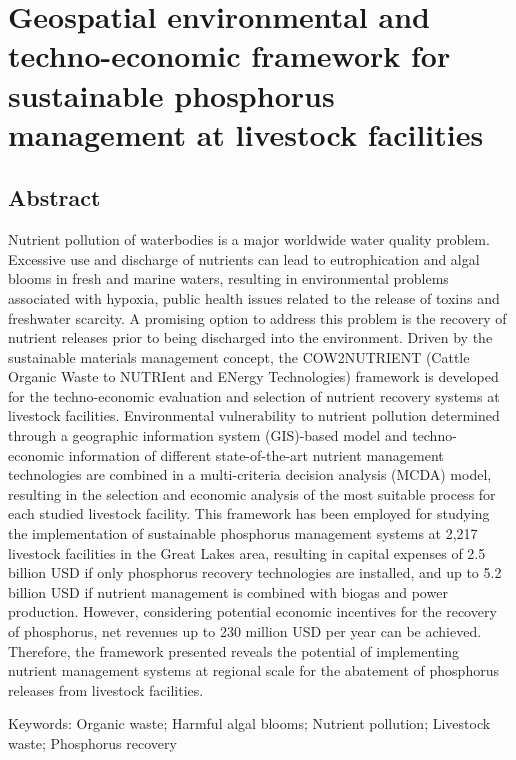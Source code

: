 \chapter{Geospatial environmental and techno-economic framework for	sustainable phosphorus management at livestock facilities}\label{ch:Tool}
\section*{Abstract}
Nutrient pollution of waterbodies is a major worldwide water quality problem. Excessive use and discharge of nutrients can lead to eutrophication and algal blooms in fresh and marine waters, resulting in environmental problems associated with hypoxia, public health issues related to the release of toxins and freshwater scarcity. A promising option to address this problem is the recovery of nutrient releases prior to being discharged into the environment. Driven by the sustainable materials management concept, the COW2NUTRIENT (Cattle Organic Waste to NUTRIent and ENergy Technologies) framework is developed for the techno-economic evaluation and selection of nutrient recovery systems at livestock facilities. Environmental vulnerability to nutrient pollution determined through a geographic information system (GIS)-based model and techno-economic information of different state-of-the-art nutrient management technologies are combined in a multi-criteria decision analysis (MCDA) model, resulting in the selection and economic analysis of the most suitable process for each studied livestock facility. This framework has been employed for studying the implementation of sustainable phosphorus management systems at 2,217 livestock facilities in the Great Lakes area, resulting in capital expenses of 2.5 billion USD if only phosphorus recovery technologies are installed, and up to 5.2 billion USD if nutrient management is combined with biogas and power production. However, considering potential economic incentives for the recovery of phosphorus, net revenues up to 230 million USD per year can be achieved. Therefore, the framework presented reveals the potential of implementing nutrient management systems at regional scale for the abatement of phosphorus releases from livestock facilities.

\bigskip
Keywords: Organic waste; Harmful algal blooms; Nutrient pollution; Livestock waste; Phosphorus recovery

